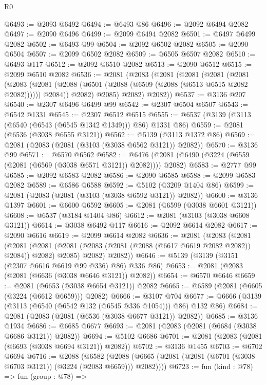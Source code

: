 \begin{lexlean}{R0}
\begin{coremodule}
@6493 := @2093 @6492
@6494 := @6493 @86
@6496 := @2092 @6494 @2082
@6497 := @2090 @6496
@6499 := @2099 @6494 @2082
@6501 := @6497 @6499 @2082
@6502 := @6493 @99
@6504 := @2092 @6502 @2082
@6505 := @2090 @6504
@6507 := @2099 @6502 @2082
@6509 := @6505 @6507 @2082
@6510 := @6493 @117
@6512 := @2092 @6510 @2082
@6513 := @2090 @6512
@6515 := @2099 @6510 @2082
@6536 := @2081
    (@2083
      (@2081
        (@2081
          (@2081
            (@2081
              (@2083
                (@2081 (@2088 (@6501 (@2088 (@6509 (@2088 (@6513 @6515 @2082 @2082)))))) @2084))
              @2082)
            @2085)
          @2082)
        @2082))
@6537 := @3136 @207
@6540 := @2307 @6496 @6499 @99
@6542 := @2307 @6504 @6507
@6543 := @6542 @1331
@6545 := @2307 @6512 @6515
@6555 := @6537 (@3139 (@3113 (@6540 (@6543 (@6545 @1342 @1349))) @86) @1331 @86)
@6559 := @2081 (@6536 (@3038 @6555 @3121))
@6562 := @5139 (@3113 @1372 @86)
@6569 := @2081 (@2083 (@2081 (@3103 (@3038 @6562 @3121)) @2082))
@6570 := @3136 @99
@6571 := @6570 @6562
@6582 := @6476 (@2081 (@6490 (@3224 (@6559 (@2081 (@6569 (@3038 @6571 @3121)) @2082)))) @2082)
@6583 := @2777 @99
@6585 := @2092 @6583 @2082
@6586 := @2090 @6585
@6588 := @2099 @6583 @2082
@6589 := @6586 @6588
@6592 := @5102 (@3209 @1404 @86)
@6599 := @2081 (@2083 (@2081 (@3103 (@3038 @6592 @3121)) @2082))
@6600 := @3136 @1397
@6601 := @6600 @6592
@6605 := @2081 (@6599 (@3038 @6601 @3121))
@6608 := @6537 (@3184 @1404 @86)
@6612 := @2081 (@3103 (@3038 @6608 @3121))
@6614 := @3038 @6492 @117
@6616 := @2092 @6614 @2082
@6617 := @2090 @6616
@6619 := @2099 @6614 @2082
@6636 := @2081
    (@2083
      (@2081
        (@2081
          (@2081 (@2081 (@2083 (@2081 (@2088 (@6617 @6619 @2082 @2082)) @2084)) @2082) @2085)
          @2082)
        @2082))
@6646 := @5139 (@3139 (@3151 (@2307 @6616 @6619 @99 @336) @86) @336 @86)
@6653 := @2081 (@2083 (@2081 (@6636 (@3038 @6646 @3121)) @2082))
@6654 := @6570 @6646
@6659 := @2081 (@6653 (@3038 @6654 @3121)) @2082
@6665 := @6589 (@2081 (@6605 (@3224 (@6612 @6659))) @2082)
@6666 := @3107 @704
@6677 := @6666 (@3139 (@3113 (@6540 (@6542 @132 (@6545 @336 @1054))) @86) @132 @86)
@6684 := @2081 (@2083 (@2081 (@6536 (@3038 @6677 @3121)) @2082))
@6685 := @3136 @1934
@6686 := @6685 @6677
@6693 := @2081 (@2083 (@2081 (@6684 (@3038 @6686 @3121)) @2082))
@6694 := @5102 @6686
@6701 := @2081 (@2083 (@2081 (@6693 (@3038 @6694 @3121)) @2082))
@6702 := @3136 @1455
@6703 := @6702 @6694
@6716 := @2088
    (@6582 (@2088 (@6665 (@2081 (@2081 (@6701 (@3038 @6703 @3121)) (@3224 (@2083 @6659))) @2082))))
@6723 := fun (kind : @78) =>
  fun (group : @78) =>

\end{coremodule}
\end{lexlean}
